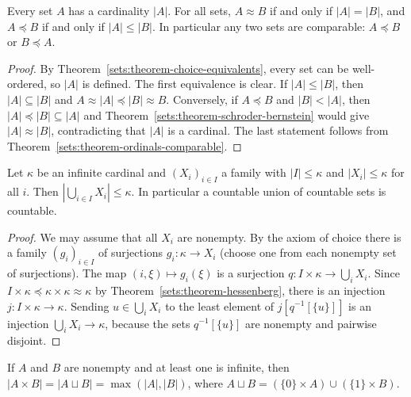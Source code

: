 \begin{proposition}\label{sets:proposition-cardinal-comparability}
Every set $A$ has a cardinality $|A|$. For all sets, $A \approx B$ if and only if
$|A| = |B|$, and $A \preceq B$ if and only if $|A| \leq |B|$. In particular any
two sets are comparable: $A \preceq B$ or $B \preceq A$.
\end{proposition}

\begin{proof}
By Theorem~\ref{sets:theorem-choice-equivalents}, every set can be well-ordered,
so $|A|$ is defined. The first equivalence is clear. If $|A| \leq |B|$, then
$|A| \subseteq |B|$ and $A \approx |A| \preceq |B| \approx B$. Conversely, if
$A \preceq B$ and $|B| < |A|$, then $|A| \preceq |B| \subseteq |A|$ and
Theorem~\ref{sets:theorem-schroder-bernstein} would give $|A| \approx |B|$,
contradicting that $|A|$ is a cardinal. The last statement follows from
Theorem~\ref{sets:theorem-ordinals-comparable}.
\end{proof}

\begin{proposition}\label{sets:proposition-union-bound}
Let $\kappa$ be an infinite cardinal and $(X_i)_{i \in I}$ a family with
$|I| \leq \kappa$ and $|X_i| \leq \kappa$ for all $i$. Then
$|\bigcup_{i \in I} X_i| \leq \kappa$. In particular a countable union of countable
sets is countable.
\end{proposition}

\begin{proof}
We may assume that all $X_i$ are nonempty. By the axiom of choice there is a
family $(g_i)_{i \in I}$ of surjections $g_i \colon \kappa \to X_i$ (choose one
from each nonempty set of surjections). The map $(i, \xi) \mapsto g_i(\xi)$ is
a surjection $q \colon I \times \kappa \to \bigcup_i X_i$. Since
$I \times \kappa \preceq \kappa \times \kappa \approx \kappa$ by
Theorem~\ref{sets:theorem-hessenberg}, there is an injection
$j \colon I \times \kappa \to \kappa$. Sending $u \in \bigcup_i X_i$ to the least
element of $j[q^{-1}[\{u\}]]$ is an injection $\bigcup_i X_i \to \kappa$, because
the sets $q^{-1}[\{u\}]$ are nonempty and pairwise disjoint.
\end{proof}

\begin{corollary}\label{sets:corollary-cardinal-arithmetic}
If $A$ and $B$ are nonempty and at least one is infinite, then
$|A \times B| = |A \sqcup B| = \max(|A|, |B|)$, where
$A \sqcup B = (\{0\} \times A) \cup (\{1\} \times B)$.
\end{corollary}

